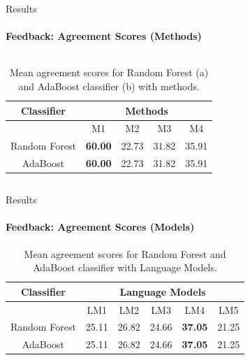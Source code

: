 \documentclass[aspectratio=169]{beamer}
\begin{document}
\begin{frame}{Results}
	\framesubtitle{Feedback: Agreement Scores (Methods)}
	\begin{columns}
		\begin{column}{1\textwidth}
	\begin{table}
			\centering
			\begin{tabular}{|c|c|c|c|c|}
				
				\hline
				\rowcolor{Gray}
				Classifier&\multicolumn{4}{|c|}{Methods}\\
				\hline
				 & M1 & M2 & M3 & M4 \\
				\hline
				Random Forest &\textbf{60.00}&22.73&31.82&35.91\\
				\hline
				AdaBoost &\textbf{60.00}&22.73&31.82&35.91\\
				\hline
			\end{tabular}
		
		\caption{Mean agreement scores for Random Forest (a) and AdaBoost classifier (b) with methods.}
	\end{table}
\end{column}
\end{columns}
\end{frame}
\begin{frame}{Results}
	\framesubtitle{Feedback: Agreement Scores (Models)}
	\begin{table}
			\centering
			\begin{tabular}{|c|c|c|c|c|c|}
				
			\hline
			\rowcolor{Gray}
			Classifier&\multicolumn{5}{|c|}{Language Models}\\
			\hline
			 & LM1 & LM2 & LM3 & LM4 & LM5 \\
			\hline
			Random Forest &25.11& 26.82& 24.66& \textbf{37.05}& 21.25\\
			\hline
			AdaBoost &25.11& 26.82& 24.66& \textbf{37.05}& 21.25\\
			\hline
			\end{tabular}
		\caption{Mean agreement scores for Random Forest and AdaBoost classifier with Language Models.}
	\end{table}
	
\end{frame}
\end{document}
